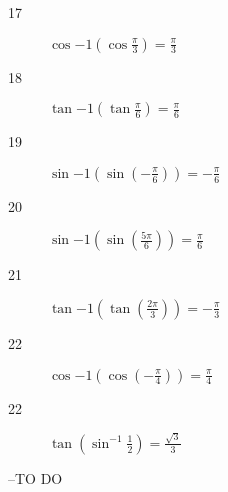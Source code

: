 \documentclass{exam}
\begin{document}
\begin{description}
      \item[17] $\cos{-1} \left( \cos \frac{\pi}{3} \right) = \boxed{ \frac{\pi}{3} }$

      \item[18] $\tan{-1} \left( \tan \frac{\pi}{6} \right) = \boxed{ \frac{\pi}{6} }$

      \item[19] $\sin{-1} \left( \sin \left( -\frac{\pi}{6} \right) \right) = \boxed{ - \frac{\pi}{6} }$

      \item[20] $\sin{-1} \left( \sin \left( \frac{5 \pi}{6} \right) \right) = \boxed{ \frac{\pi}{6} }$

      \item[21] $\tan{-1} \left( \tan \left( \frac{2 \pi}{3} \right) \right) = \boxed{ - \frac{\pi}{3} }$

      \item[22] $\cos{-1} \left( \cos \left( - \frac{\pi}{4} \right) \right) = \boxed{ \frac{\pi}{4} }$

      \item[22] $\tan \left( \sin^{-1} \frac{1}{2} \right) = \boxed{ \frac{\sqrt{3}}{3} }$

    \end{description}

  \else
    \vspace{5 cm}

    \begin{quote}
      \begin{em}
      \end{em}
    \end{quote}
    \hspace{1 cm} --TO DO
  \fi
\end{document}

